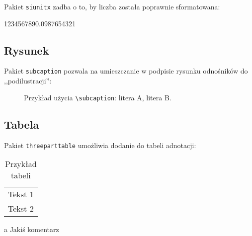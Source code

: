 Pakiet \texttt{siunitx} zadba o to, by liczba została poprawnie sformatowana: \\
\begin{center}
	\num{1234567890.0987654321}
\end{center}


\subsection{Rysunek}

Pakiet \texttt{subcaption} pozwala na umieszczanie w podpisie rysunku odnośników do ,,podilustracji'': \\

\begin{figure}[h]
	\centering
	\begin{subfigure}{0.35\textwidth}
		\centering
		\subcaption{\label{subfigure_a}}
	\end{subfigure}
	\begin{subfigure}{0.35\textwidth}
		\centering
		\subcaption{\label{subfigure_b}}
	\end{subfigure}
	
	\caption{\label{fig:subcaption_example}Przykład użycia \texttt{\textbackslash subcaption}: \protect{} litera A, \protect{} litera B.}
\end{figure}

\subsection{Tabela}

Pakiet \texttt{threeparttable} umożliwia dodanie do tabeli adnotacji: \\

\begin{table}[h]
	\centering
	
	\begin{threeparttable}
		\caption{Przykład tabeli}
		\label{tab:table_example}
		
		\begin{tabularx}{0.6\textwidth}{C{1}}
			\toprule
			 \\
			\midrule
			Tekst 1 \\
			Tekst 2 \\
			\bottomrule
		\end{tabularx}
		
		\begin{tablenotes}
			\footnotesize
			\item[a] Jakiś komentarz\textellipsis
		\end{tablenotes}
		
	\end{threeparttable}
\end{table}

